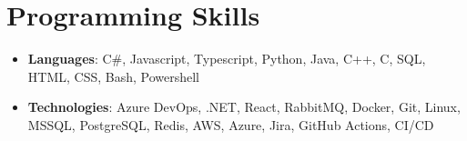 \documentclass[letterpaper,11pt]{article}
\newcommand{\resumeItem}[2]{
  \item\small{
    \textbf{#1}{: #2 \vspace{-2pt}}
  }
}
\newcommand{\resumeSubItem}[2]{\resumeItem{#1}{#2}\vspace{-4pt}}
\newcommand{\resumeSubHeadingListStart}{\begin{itemize}[leftmargin=*]}
\newcommand{\resumeSubHeadingListEnd}{\end{itemize}}
\begin{document}
\begin{comment}
\section{Projects}
  \resumeSubHeadingListStart
    \resumeSubItem{QuantSoftware Toolkit}
      {Open source python library for financial data analysis and machine learning for finance.}
    \resumeSubItem{Github Visualization}
      {Data Visualization of Git Log data using D3 to analyze project trends over time.}
    \resumeSubItem{Recommendation System}
      {Music and Movie recommender systems using collaborative filtering on public datasets.}
    \resumeSubItem{Mac Setup}
      {Book that gives step by step instructions on setting up developer environment on Mac OS.}
  \resumeSubHeadingListEnd
\end{comment}

%
\section{Programming Skills}
  \resumeSubHeadingListStart
    \item{
      \textbf{Languages}{: C\#, Javascript, Typescript, Python, Java, C++, C, SQL, HTML, CSS, Bash, Powershell}
    }
    \item{
      \textbf{Technologies}{: Azure DevOps, .NET, React, RabbitMQ, Docker, Git, Linux, MSSQL, PostgreSQL, Redis, AWS, Azure, Jira, GitHub Actions, CI/CD}
    }
  \resumeSubHeadingListEnd


\end{document}
